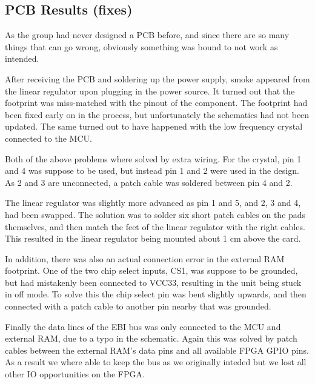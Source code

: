
\subsection{PCB Results (fixes)}

As the group had never designed a PCB before, and since there are so many things
that can go wrong, obviously something was bound to not work as intended.

After receiving the PCB and soldering up the power supply, smoke appeared from
the linear regulator upon plugging in the power source. It turned out that the
footprint was miss-matched with the pinout of the component. The footprint had
been fixed early on in the process, but unfortunately the schematics had not
been updated. The same turned out to have happened with the low frequency
crystal connected to the MCU.

Both of the above problems where solved by extra wiring. For the crystal, pin 1
and 4 was suppose to be used, but instead pin 1 and 2 were used in the design.
As 2 and 3 are unconnected, a patch cable was soldered between pin 4 and 2.

The linear regulator was slightly more advanced as pin 1 and 5, and 2, 3 and 4,
had been swapped. The solution was to solder six short patch cables on the pads
themselves, and then match the feet of the linear regulator with the right
cables. This resulted in the linear regulator being mounted about 1 cm above the
card. 

In addition, there was also an actual connection error in the external RAM
footprint. One of the two chip select inputs, CS1, was suppose to be grounded,
but had mistakenly been connected to VCC33, resulting in the unit being stuck in
off mode. To solve this the chip select pin was bent slightly upwards, and then
connected with a patch cable to another pin nearby that was grounded.

Finally the data lines of the EBI bus was only connected to the MCU and external
RAM, due to a typo in the schematic. Again this was solved by patch cables
between the external RAM's data pins and all available FPGA GPIO pins. As a
result we where able to keep the bus as we originally inteded  but we lost all other IO
opportunities on the FPGA. 
